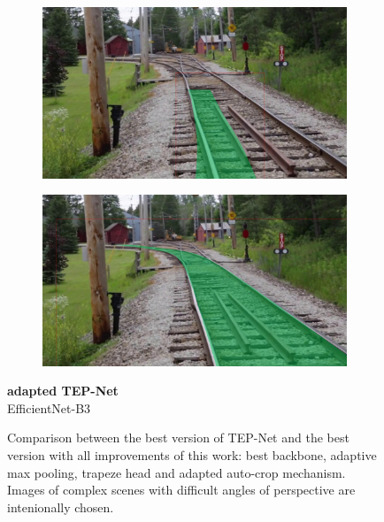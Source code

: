 \begin{figure}[H]
\begin{minipage}{0.6\textwidth}
        \begin{subfigure}[b]{0.48\textwidth}
            \centering
            \includegraphics[width=\textwidth]{PICs/experiments/ComparisonBaselineToImproved/original3.jpg}
        \end{subfigure}
        \begin{subfigure}[b]{0.48\textwidth}
            \centering
            \includegraphics[width=\textwidth]{PICs/experiments/ComparisonBaselineToImproved/adapted3.jpg}
        \end{subfigure}
    \end{minipage}%
    \hfill
    \begin{minipage}{0.2\textwidth} %
        \centering
        \textbf{adapted TEP-Net}\\
        EfficientNet-B3
    \end{minipage}
    \caption{Comparison between the best version of TEP-Net \cite{tepNet2024} and the best version with all improvements of this work: best backbone, adaptive max pooling, trapeze head and adapted auto-crop mechanism.
    Images of complex scenes with difficult angles of perspective are intenionally chosen.}
    \label{fig:comparisonBaseline2Improved}
\end{figure}